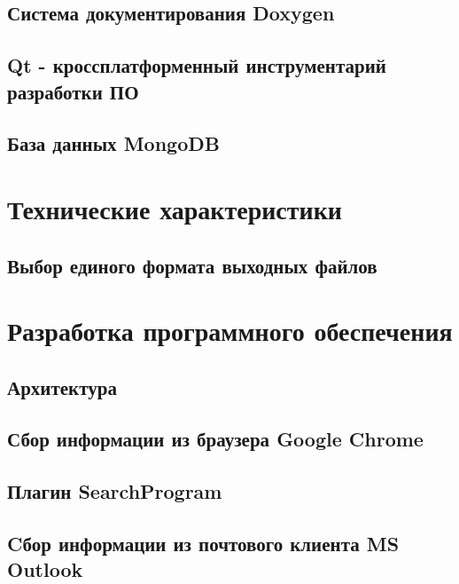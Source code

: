 \subsection{Система документирования Doxygen}

\subsection{Qt - кроссплатформенный инструментарий разработки ПО}

\subsection{База данных MongoDB}


\section{Технические характеристики}

\subsection{Выбор единого формата выходных файлов}


\section{Разработка программного обеспечения}
\setcounter{figure}{0}
 
\subsection{Архитектура}


\newpage
\subsection{Сбор информации из браузера Google Chrome} %


\newpage
\subsection{Плагин SearchProgram} %


\newpage
\subsection{Cбор информации из почтового клиента MS Outlook} %


